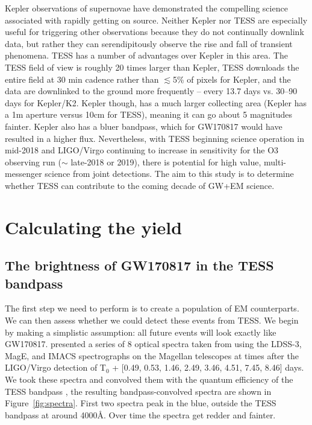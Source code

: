 \documentclass[modern]{aastex61}
\begin{document}
Kepler observations of supernovae \citep{Olling2015,Garnavich2016} have demonstrated the compelling science associated with rapidly getting on source. Neither Kepler nor TESS are especially useful for triggering other observations because they do not continually downlink data, but rather they can serendipitously observe the rise and fall of transient phenomena. TESS has a number of advantages over Kepler in this area. The TESS field of view is roughly 20 times larger than Kepler, TESS downloads the entire field at 30 min cadence rather than $\lesssim$5\% of pixels for Kepler, and the data are downlinked to the ground more frequently -- every 13.7 days vs. 30--90 days for Kepler/K2. Kepler though, has a much larger collecting area (Kepler has a 1m aperture versus 10cm for TESS), meaning it can go about 5 magnitudes fainter. Kepler also has a bluer bandpass, which for GW170817 would have resulted in a higher flux. Nevertheless, with TESS beginning science operation in mid-2018 and LIGO/Virgo continuing to increase in sensitivity for the O3 observing run ($\sim$ late-2018 or 2019), there is potential for high value, multi-messenger science from joint detections. The aim to this study is to determine whether TESS can contribute to the coming decade of GW+EM science. 

\section{Calculating the yield}
\subsection{The brightness of GW170817 in the TESS bandpass}
The first step we need to perform is to create a population of EM counterparts. We can then assess whether we could detect these events from TESS. We begin by making a simplistic assumption: all future events will look exactly like GW170817. \citet{Shappee2017} presented a series of 8 optical spectra taken from using the LDSS-3, MagE, and IMACS spectrographs on the Magellan telescopes at times after the LIGO/Virgo detection of T$_0$ + [0.49, 0.53, 1.46, 2.49, 3.46, 4.51, 7.45, 8.46] days. We took these spectra and convolved them with the quantum efficiency of the TESS bandpass \citep{Ricker2015}, the resulting bandpass-convolved spectra are shown in Figure~\ref{fig:spectra}. First two spectra peak in the blue, outside the TESS bandpass at around 4000\AA. Over time the spectra get redder and fainter.
\end{document}
